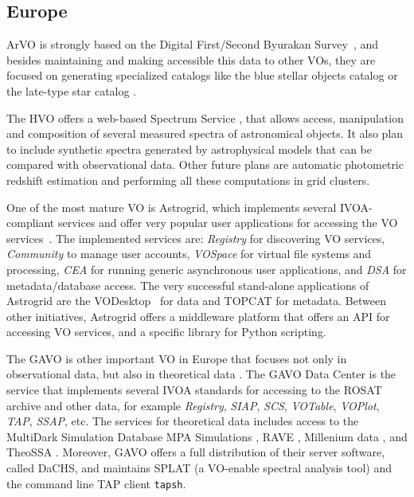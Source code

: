 \subsection{Europe}

ArVO is strongly based on the Digital First/Second Byurakan 
Survey~\cite{}, 
and besides maintaining and making accessible this data to other VOs,
they are focused on generating specialized catalogs like the
blue stellar objects catalog or the late-type star catalog \cite{}.

The HVO offers a web-based Spectrum Service \cite{},
that allows access, manipulation and composition of
several measured spectra of astronomical objects. It
also plan to include synthetic spectra generated by
astrophysical models that can be compared with observational
data. Other future plans are automatic photometric redshift 
estimation and performing all these computations in grid clusters. 

One of the most mature VO is Astrogrid, which implements
several IVOA-compliant services and offer very popular user applications
for accessing the VO services~\cite{}.
The implemented services are: \emph{Registry}
for discovering VO services, \emph{Community} to manage user accounts, 
\emph{VOSpace} for virtual file systems and processing, \emph{CEA} for running
generic asynchronous user applications, and \emph{DSA} for metadata/database
access. The very successful stand-alone applications of Astrogrid are 
the VODesktop~\cite{} for data and
TOPCAT \cite{} for metadata.
Between other initiatives, Astrogrid offers a middleware platform 
that offers an API for accessing VO services, and a specific 
library for Python scripting.


The GAVO is other important VO in Europe that focuses not
only in observational data, but also in theoretical data \cite{}.
The GAVO Data Center is the service that implements several IVOA standards for 
accessing to the ROSAT archive and other data, for example 
\emph{Registry}, \emph{SIAP}, \emph{SCS}, \emph{VOTable}, \emph{VOPlot}, 
\emph{TAP}, \emph{SSAP}, etc. The services for 
theoretical data includes access to the MultiDark Simulation Database \cite{}
MPA Simulations \cite{},
RAVE \cite{},
%
Millenium data \cite{},
%
and TheoSSA \cite{}.
Moreover, GAVO offers a full distribution of their server software, called
DaCHS, and maintains SPLAT (a VO-enable spectral analysis tool) and the command line TAP
client \texttt{tapsh}.

